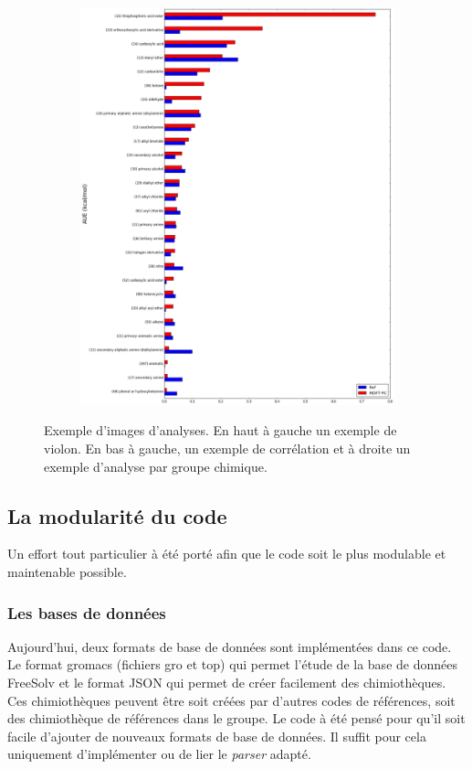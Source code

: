 \begin{figure}[H]
\begin{subfigure}[b]{0.40\textwidth}
   \end{subfigure}
   \hspace{5mm}
   \begin{subfigure}[b]{0.59\textwidth}
         \includegraphics[width=\textwidth]{chapters/BDD/images/freesolv_1/PC_error_by_groups.png}
    \end{subfigure}
  \caption{Exemple d'images d'analyses. En haut à gauche un exemple de violon. En bas à gauche, un exemple de corrélation et à droite un exemple d'analyse par groupe chimique.}
  \label{fig:examples}
\end{figure}


\subsection{La modularité du code}
Un effort tout particulier à été porté afin que le code soit le plus modulable et maintenable possible. 

\subsubsection{Les bases de données}
Aujourd'hui, deux formats de base de données sont implémentées dans ce code. Le format gromacs (fichiers gro et top) qui permet l'étude de la base de données FreeSolv et le format JSON qui permet de créer facilement des chimiothèques. Ces chimiothèques peuvent être soit créées par d'autres codes de références, soit des chimiothèque de références dans le groupe. Le code à été pensé pour qu'il soit facile d'ajouter de nouveaux formats de base de données. Il suffit pour cela uniquement d'implémenter ou de lier le \textit{parser} adapté.

